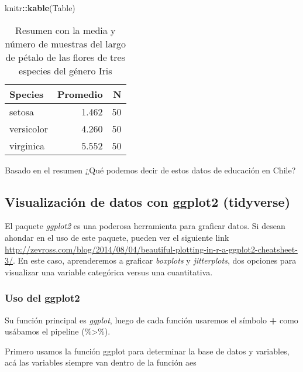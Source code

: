 \documentclass[]{book}
\newenvironment{Shaded}{\begin{snugshade}}{\end{snugshade}}
\newcommand{\KeywordTok}[1]{\textcolor[rgb]{0.13,0.29,0.53}{\textbf{#1}}}
\newcommand{\NormalTok}[1]{#1}
\newcommand{\OperatorTok}[1]{\textcolor[rgb]{0.81,0.36,0.00}{\textbf{#1}}}
\begin{document}
\begin{Shaded}
\begin{Highlighting}[]
\NormalTok{knitr}\OperatorTok{::}\KeywordTok{kable}\NormalTok{(Table)}
\end{Highlighting}
\end{Shaded}

\begin{table}

\caption{\label{tab:MediaIris}Resumen con la media y número de muestras del largo de pétalo de las flores de tres especies del género Iris}
\centering
\begin{tabular}[t]{lrr}
\toprule
Species & Promedio & N\\
\midrule
setosa & 1.462 & 50\\
versicolor & 4.260 & 50\\
virginica & 5.552 & 50\\
\bottomrule
\end{tabular}
\end{table}

Basado en el resumen ¿Qué podemos decir de estos datos de educación en Chile?

\hypertarget{visualizacion-de-datos-con-ggplot2-tidyverse}{%
\subsection{Visualización de datos con ggplot2 (tidyverse)}\label{visualizacion-de-datos-con-ggplot2-tidyverse}}

El paquete \emph{ggplot2} \citep{WickhamGG2016} es una poderosa herramienta para graficar datos. Si desean ahondar en el uso de este paquete, pueden ver el siguiente link \url{http://zevross.com/blog/2014/08/04/beautiful-plotting-in-r-a-ggplot2-cheatsheet-3/}. En este caso, aprenderemos a graficar \emph{boxplots} y \emph{jitterplots}, dos opciones para visualizar una variable categórica versus una cuantitativa.

\hypertarget{uso-del-ggplot2}{%
\subsubsection{Uso del ggplot2}\label{uso-del-ggplot2}}

Su función principal es \emph{ggplot}, luego de cada función usaremos el símbolo \textbf{+} como usábamos el pipeline (\%\textgreater{}\%).

Primero usamos la función ggplot para determinar la base de datos y variables, acá las variables siempre van dentro de la función aes
\end{document}
